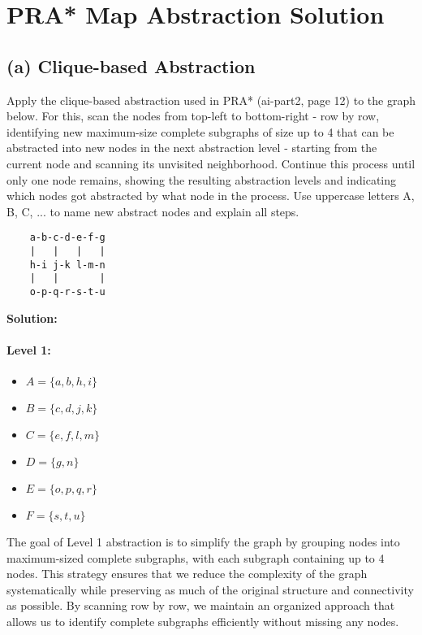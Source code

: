 \documentclass{article}
\begin{document}
\section*{PRA* Map Abstraction Solution}

\subsection*{(a) Clique-based Abstraction}
Apply the clique-based abstraction used in PRA* (ai-part2, page 12) to the graph below. For this, scan the nodes from top-left to bottom-right - row by row, identifying new maximum-size complete subgraphs of size up to 4 that can be abstracted into new nodes in the next abstraction level - starting from the current node and scanning its unvisited neighborhood. Continue this process until only one node remains, showing the resulting abstraction levels and indicating which nodes got abstracted by what node in the process. Use uppercase letters A, B, C, ... to name new abstract nodes and explain all steps.

\begin{verbatim}
    a-b-c-d-e-f-g
    |   |   |   |
    h-i j-k l-m-n
    |   |       |
    o-p-q-r-s-t-u
\end{verbatim}

\textbf{Solution:}

\paragraph{Level 1:}
\begin{itemize}
    \item $A = \{a, b, h, i\}$
    \item $B = \{c, d, j, k\}$
    \item $C = \{e, f, l, m\}$
    \item $D = \{g, n\}$
    \item $E = \{o, p, q, r\}$
    \item $F = \{s, t, u\}$
\end{itemize}
The goal of Level 1 abstraction is to simplify the graph by grouping nodes into maximum-sized complete subgraphs, with each subgraph containing up to 4 nodes. This strategy ensures that we reduce the complexity of the graph systematically while preserving as much of the original structure and connectivity as possible. By scanning row by row, we maintain an organized approach that allows us to identify complete subgraphs efficiently without missing any nodes.
\end{document}
